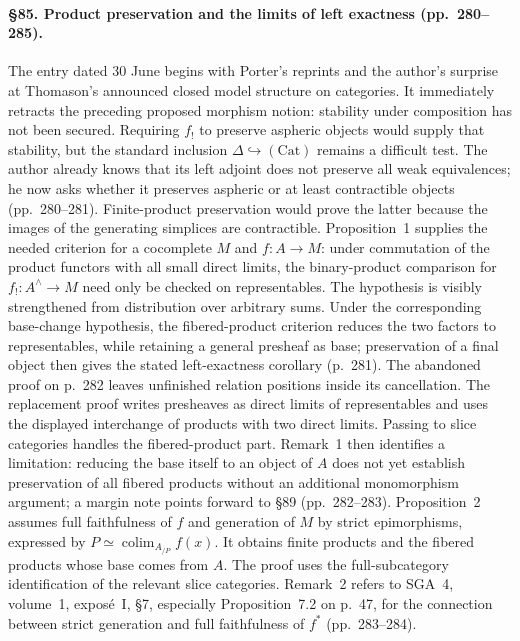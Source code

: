 \paragraph{\S85. Product preservation and the limits of left exactness (pp.\ 280--285).}
The entry dated 30 June begins with Porter's reprints and the author's surprise at Thomason's announced closed model structure on categories. It immediately retracts the preceding proposed morphism notion: stability under composition has not been secured. Requiring $f_!$ to preserve aspheric objects would supply that stability, but the standard inclusion $\Delta\hookrightarrow(\mathrm{Cat})$ remains a difficult test. The author already knows that its left adjoint does not preserve all weak equivalences; he now asks whether it preserves aspheric or at least contractible objects (pp.\ 280--281). Finite-product preservation would prove the latter because the images of the generating simplices are contractible. Proposition~1 supplies the needed criterion for a cocomplete $M$ and $f:A\to M$: under commutation of the product functors with all small direct limits, the binary-product comparison for $f_!:A^\wedge\to M$ need only be checked on representables. The hypothesis is visibly strengthened from distribution over arbitrary sums. Under the corresponding base-change hypothesis, the fibered-product criterion reduces the two factors to representables, while retaining a general presheaf as base; preservation of a final object then gives the stated left-exactness corollary (p.\ 281).
The abandoned proof on p.\ 282 leaves unfinished relation positions inside its cancellation. The replacement proof writes presheaves as direct limits of representables and uses the displayed interchange of products with two direct limits. Passing to slice categories handles the fibered-product part. Remark~1 then identifies a limitation: reducing the base itself to an object of $A$ does not yet establish preservation of all fibered products without an additional monomorphism argument; a margin note points forward to \S89 (pp.\ 282--283). Proposition~2 assumes full faithfulness of $f$ and generation of $M$ by strict epimorphisms, expressed by $P\simeq\mathop{\mathrm{colim}}_{A_{/P}}f(x)$. It obtains finite products and the fibered products whose base comes from $A$. The proof uses the full-subcategory identification of the relevant slice categories. Remark~2 refers to SGA~4, volume~1, expos\'e~I, \S7, especially Proposition~7.2 on p.\ 47, for the connection between strict generation and full faithfulness of $f^*$ (pp.\ 283--284).
